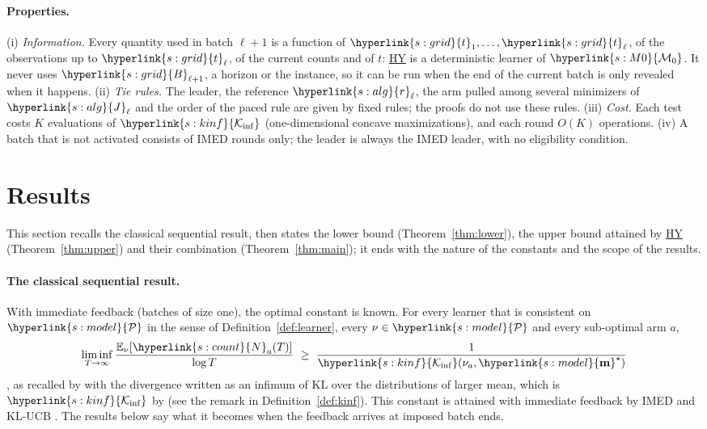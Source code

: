 \documentclass[10pt]{article}
\newcommand{\sy}[2]{{\hyperlink{#1}{#2}}}
\newcommand{\E}{\mathbb{E}}
\newcommand{\1}{\mathbf{1}}
\newcommand{\KL}{\mathrm{KL}}
\newcommand{\m}{\sy{s:model}{\mathbf{m}}}
\newcommand{\cP}{\sy{s:model}{\mathcal P}}
\newcommand{\Ki}{\sy{s:kinf}{\mathcal K_{\inf}}}
\newcommand{\Ng}{\sy{s:count}{N}}
\newcommand{\Mz}{\sy{s:M0}{\mathcal M_0}}
\newcommand{\tl}{\sy{s:grid}{t}}
\newcommand{\Bg}{\sy{s:grid}{B}}
\newcommand{\HY}{\hyperref[def:hy]{\textup{HY}}}
\newcommand{\rr}{\sy{s:alg}{r}}
\newcommand{\Jg}{\sy{s:alg}{J}}
\begin{document}
\paragraph{Properties.} (i) \emph{Information.} Every quantity used in batch $\ell+1$ is a function of $\tl_1,\dots,\tl_\ell$, of the observations up to $\tl_\ell$, of the current counts and of
$t$: \HY{} is a deterministic learner of $\Mz$. It never uses $\Bg_{\ell+1}$, a horizon or the instance, so it can be run when the end of the current batch is only revealed
when it happens. (ii) \emph{Tie rules.} The leader, the reference $\rr_\ell$, the arm pulled among several minimizers of $\Jg_\ell$ and the order of the paced rule are given by
fixed rules; the proofs do not use these rules. (iii) \emph{Cost.} Each test costs $K$ evaluations of $\Ki$ (one-dimensional concave maximizations), and each round $O(K)$ operations.
(iv) A batch that is not activated consists of IMED rounds only; the leader is always the IMED leader, with no eligibility condition.

\section{Results}\label{sec:main}\label{sec:results}

This section recalls the classical sequential result, then states the lower bound (Theorem~\ref{thm:lower}), the upper bound attained by
\HY{} (Theorem~\ref{thm:upper}) and their combination (Theorem~\ref{thm:main}); it ends with the nature of the constants and the scope of
the results.

\paragraph{The classical sequential result.} With immediate feedback (batches of size one), the optimal constant is known. For every
learner that is consistent on $\cP$ in the sense of Definition~\ref{def:learner}, every $\nu\in\cP$ and every sub-optimal arm $a$,
\[
\liminf_{T\to\infty}\frac{\E_\nu[\Ng_a(T)]}{\log T}\ \ge\ \frac1{\Ki(\nu_a,\m^\star)}
\]
\citep[Proposition~1]{BK96}, as recalled by \citet[(2)]{HT10} with the divergence written as an infimum of $\KL$ over the distributions of larger mean,
which is $\Ki$ by \citet[Theorem~8]{HT10} (see the remark in Definition~\ref{def:kinf}). This constant is attained with immediate feedback by IMED \citep{HT15}
and KL-UCB \citep{CGMMS13,GHMS22}. The results below say what it becomes when the feedback arrives at imposed batch ends.
\end{document}
